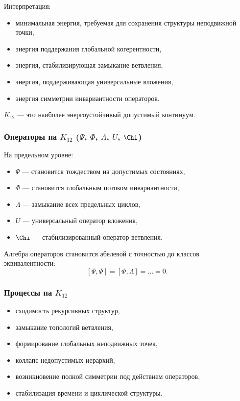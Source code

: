Интерпретация:
\begin{itemize}
    \item минимальная энергия, требуемая для сохранения структуры неподвижной
          точки,
    \item энергия поддержания глобальной когерентности,
    \item энергия, стабилизирующая замыкание ветвления,
    \item энергия, поддерживающая универсальные вложения,
    \item энергия симметрии инвариантности операторов.
\end{itemize}

$K_{12}$ — это наиболее энергоустойчивый допустимый континуум.

\subsubsection{Операторы на $K_{12}$ ($\Psi$, $\Phi$, $\Lambda$, $U$, $\Chi$)}

На предельном уровне:

\begin{itemize}
    \item $\Psi$ — становится тождеством на допустимых состояниях,
    \item $\Phi$ — становится глобальным потоком инвариантности,
    \item $\Lambda$ — замыкание всех предельных циклов,
    \item $U$ — универсальный оператор вложения,
    \item $\Chi$ — стабилизированный оператор ветвления.
\end{itemize}

Алгебра операторов становится абелевой с точностью до классов эквивалентности:
\[
[\Psi,\Phi]=[\Phi,\Lambda]=\dots = 0.
\]

\subsubsection{Процессы на $K_{12}$}

\begin{itemize}
    \item сходимость рекурсивных структур,
    \item замыкание топологий ветвления,
    \item формирование глобальных неподвижных точек,
    \item коллапс недопустимых иерархий,
    \item возникновение полной симметрии под действием операторов,
    \item стабилизация времени и циклической структуры.
\end{itemize}

